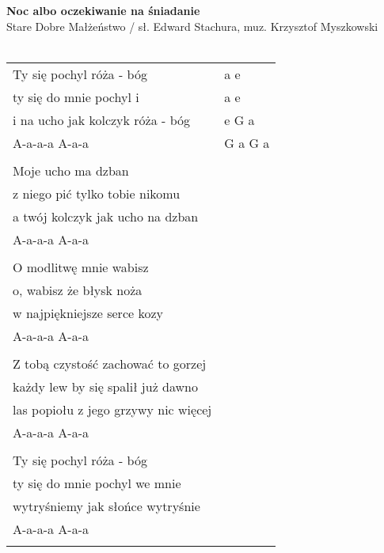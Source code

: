 \documentclass[a5paper]{article}
\begin{document}


\noindent
\fontsize{12pt}{15pt}\selectfont
\textbf{Noc albo oczekiwanie na śniadanie} \\
\fontsize{8pt}{10pt}\selectfont
Stare Dobre Małżeństwo / sł. Edward Stachura, muz. Krzysztof Myszkowski \\ \\
\fontsize{10pt}{12pt}\selectfont
{}
\begin{tabular}{@{}p{7.50cm}p{3cm}@{}}
\noindent
Ty się pochyl róża - bóg & a e \\
ty się do mnie pochyl i & a e \\
i na ucho jak kolczyk róża - bóg & e G a \\
A-a-a-a A-a-a & G a G a \\ \\

Moje ucho ma dzban \\
z niego pić tylko tobie nikomu \\
a twój kolczyk jak ucho na dzban \\
A-a-a-a A-a-a \\ \\

O modlitwę mnie wabisz\\
o, wabisz że błysk noża \\
w najpiękniejsze serce kozy \\
A-a-a-a A-a-a \\ \\

Z tobą czystość zachować to gorzej\\ 
każdy lew by się spalił już dawno \\
las popiołu z jego grzywy nic więcej \\
A-a-a-a A-a-a \\ \\

Ty się pochyl róża - bóg \\
ty się do mnie pochyl we mnie \\
wytryśniemy jak słońce wytryśnie \\
A-a-a-a A-a-a \\ \\
\end{tabular}
\end{document}
